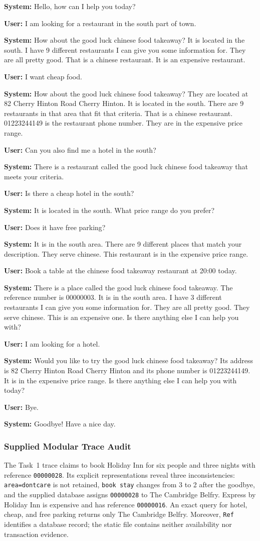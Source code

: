 \documentclass[11pt]{article}
\newcommand{\dialogueturn}[2]{\noindent\textbf{#1:} #2\par\smallskip}
\begin{document}
\begingroup
\small
\dialogueturn{System}{Hello, how can I help you today?}
\dialogueturn{User}{I am looking for a restaurant in the south part of town.}
\dialogueturn{System}{How about the good luck chinese food takeaway? It is
located in the south. I have 9 different restaurants I can give you some
information for. They are all pretty good. That is a chinese restaurant. It is
an expensive restaurant.}
\dialogueturn{User}{I want cheap food.}
\dialogueturn{System}{How about the good luck chinese food takeaway? They are
located at 82 Cherry Hinton Road Cherry Hinton. It is located in the south.
There are 9 restaurants in that area that fit that criteria. That is a chinese
restaurant. 01223244149 is the restaurant phone number. They are in the
expensive price range.}
\dialogueturn{User}{Can you also find me a hotel in the south?}
\dialogueturn{System}{There is a restaurant called the good luck chinese food
takeaway that meets your criteria.}
\dialogueturn{User}{Is there a cheap hotel in the south?}
\dialogueturn{System}{It is located in the south. What price range do you
prefer?}
\dialogueturn{User}{Does it have free parking?}
\dialogueturn{System}{It is in the south area. There are 9 different places
that match your description. They serve chinese. This restaurant is in
the expensive price range.}
\dialogueturn{User}{Book a table at the chinese food takeaway restaurant at
20:00 today.}
\dialogueturn{System}{There is a place called the good luck chinese food
takeaway. The reference number is 00000003. It is in the south area. I have 3
different restaurants I can give you some information for. They are all pretty
good. They serve chinese. This is an expensive one. Is there anything else I
can help you with?}
\dialogueturn{User}{I am looking for a hotel.}
\dialogueturn{System}{Would you like to try the good luck chinese food
takeaway? Its address is 82 Cherry Hinton Road Cherry Hinton and its phone
number is 01223244149. It is in the expensive price range. Is there anything
else I can help you with today?}
\dialogueturn{User}{Bye.}
\dialogueturn{System}{Goodbye! Have a nice day.}
\endgroup

\subsubsection{Supplied Modular Trace Audit}
\label{app:exercise6}
The Task~1 trace claims to book Holiday Inn for six people and three nights
with reference \texttt{00000028}. Its explicit representations reveal three
inconsistencies: \texttt{area=dontcare} is not retained, \texttt{book stay}
changes from 3 to 2 after the goodbye, and the supplied database assigns
\texttt{00000028} to The Cambridge Belfry. Express by Holiday Inn is expensive
and has reference \texttt{00000016}. An exact query for hotel, cheap, and free
parking returns only The Cambridge Belfry. Moreover, \texttt{Ref} identifies a
database record; the static file contains neither availability nor transaction
evidence.
\end{document}
